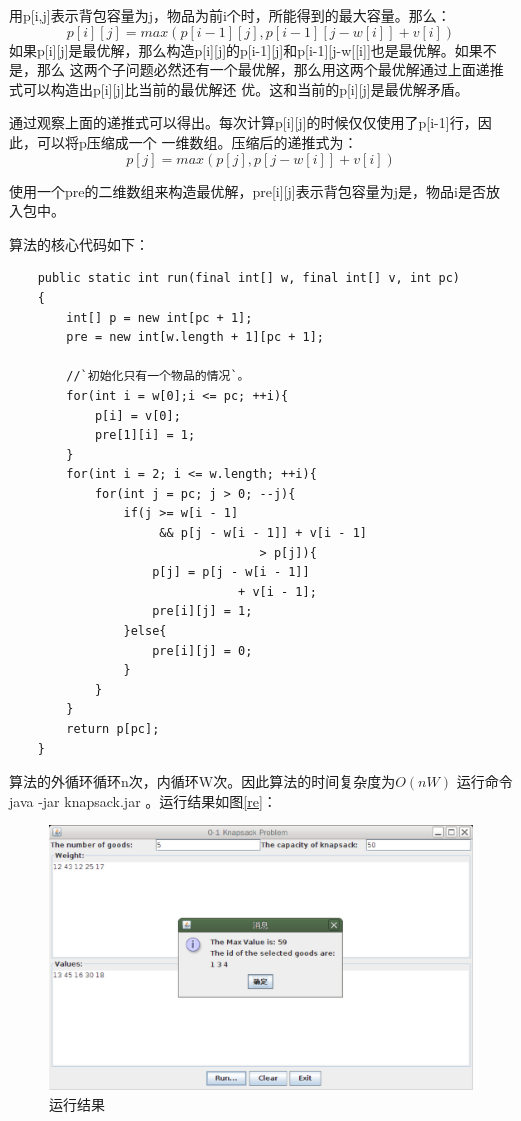 \documentclass[a4paper, 11pt]{article}
\theoremstyle{plain}\newtheorem{Lemma}{定理}
\begin{document}
用p[i,j]表示背包容量为j，物品为前i个时，所能得到的最大容量。那么：
\begin{displaymath}
p[i][j] = max(p[i - 1][j], p[i - 1][j - w[i]] + v[i])
\end{displaymath}
如果p[i][j]是最优解，那么构造p[i][j]的p[i-1][j]和p[i-1][j-w[[i]]也是最优解。如果不是，那么
这两个子问题必然还有一个最优解，那么用这两个最优解通过上面递推式可以构造出p[i][j]比当前的最优解还
优。这和当前的p[i][j]是最优解矛盾。

通过观察上面的递推式可以得出。每次计算p[i][j]的时候仅仅使用了p[i-1]行，因此，可以将p压缩成一个
一维数组。压缩后的递推式为：
\begin{displaymath}
p[j] = max(p[j], p[j - w[i]] + v[i])
\end{displaymath}

使用一个pre的二维数组来构造最优解，pre[i][j]表示背包容量为j是，物品i是否放入包中。

算法的核心代码如下：
\begin{lstlisting}
	public static int run(final int[] w, final int[] v, int pc)
	{		
		int[] p = new int[pc + 1];
		pre = new int[w.length + 1][pc + 1];
			
		//`初始化只有一个物品的情况`。
		for(int i = w[0];i <= pc; ++i){
			p[i] = v[0];
			pre[1][i] = 1;
		}
		for(int i = 2; i <= w.length; ++i){
			for(int j = pc; j > 0; --j){
				if(j >= w[i - 1] 
				     && p[j - w[i - 1]] + v[i - 1]
				                   > p[j]){
					p[j] = p[j - w[i - 1]] 
					            + v[i - 1];
					pre[i][j] = 1;
				}else{
					pre[i][j] = 0;
				}
			}
		}
		return p[pc];
	}
\end{lstlisting}

算法的外循环循环n次，内循环W次。因此算法的时间复杂度为$O(nW)$
运行命令 java -jar knapsack.jar 。运行结果如图\ref{re}：
\begin{figure}[htbp]
\centering
\caption{运行结果}
\label{re}
\label{btsp}
\includegraphics[height=7cm, width=12cm]{knapsack.eps}
\end{figure}
\end{document}
